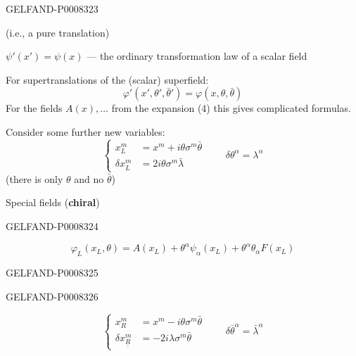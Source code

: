 \begin{GelfandAdjacentEvidence}{GELFAND-P000832}{3}


(i.e., a pure translation)


\(\psi'(x')=\psi(x)\) — the ordinary transformation law of a scalar field

For supertranslations of the (scalar) superfield:
\begin{equation*}
\varphi'(x',\theta',\bar\theta')=\varphi(x,\theta,\bar\theta)
\tag{8}
\end{equation*}
For the fields \(A(x),\ldots\) from the expansion (4) this gives complicated formulas.

Consider some further new variables:
\begin{equation*}
\left\{\begin{aligned}
x_L^m&=x^m+i\theta\sigma^m\bar\theta\\
\delta x_L^m&=2i\theta\sigma^m\bar\lambda
\end{aligned}\right.
\qquad\delta\theta^\alpha=\lambda^\alpha
\tag{9}
\end{equation*}
(there is only \(\theta\) and no \(\bar\theta\))

Special fields (\textbf{chiral})
\end{GelfandAdjacentEvidence}
\begin{GelfandAdjacentEvidence}{GELFAND-P000832}{4}

\begin{equation*}
\varphi_L(x_L,\theta)=A(x_L)+\theta^\alpha\psi_\alpha(x_L)
+\theta^\alpha\theta_\alpha F(x_L)
\tag{10}
\end{equation*}
\end{GelfandAdjacentEvidence}
\begin{GelfandAdjacentEvidence}{GELFAND-P000832}{5}

\end{GelfandAdjacentEvidence}
\begin{GelfandAdjacentEvidence}{GELFAND-P000832}{6}

\begin{equation*}
\left\{\begin{aligned}
x_R^m&=x^m-i\theta\sigma^m\bar\theta\\
\delta x_{\underline{\underline R}}^m&=-2i\lambda\sigma^m\bar\theta
\end{aligned}\right.
\qquad\delta\bar\theta^{\dot\alpha}=\bar\lambda^{\dot\alpha}
\tag{11}
\end{equation*}
\end{GelfandAdjacentEvidence}



